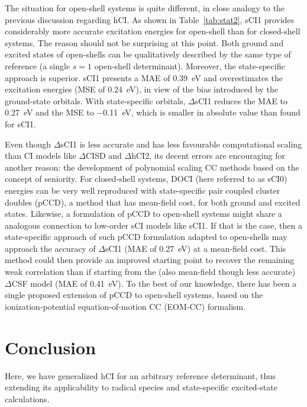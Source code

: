 \documentclass[aip,jcp,reprint,noshowkeys,superscriptaddress]{revtex4-1}
\begin{document}
The situation for open-shell systems is quite different, in close analogy to the previous discussion regarding hCI.
As shown in Table~\ref{tab:stat2}, sCI1 provides considerably more accurate excitation energies for open-shell than for closed-shell systems.
The reason should not be surprising at this point.
Both ground and excited states of open-shells can be qualitatively described by the same type of reference (a single $s=1$ open-shell determinant).
Moreover, the state-specific approach is superior.
sCI1 presents a MAE of \SI{0.39}{\eV} and overestimates the excitation energies (MSE of \SI{+0.24}{\eV}), in view of the bias introduced by the ground-state orbitals.
With state-specific orbitals, $\Delta$sCI1 reduces the MAE to \SI{0.27}{\eV} and the MSE to \SI{-0.11}{\eV}, which is smaller in absolute value than found for sCI1.

Even though $\Delta$sCI1 is less accurate and has less favourable computational scaling than CI models like $\Delta$CISD and $\Delta$hCI2,
its decent errors are encouraging for another reason:
the development of polynomial scaling CC methods based on the concept of seniority.
For closed-shell systems, DOCI (here referred to as sCI0) energies can be very well reproduced with state-specific pair coupled cluster doubles (pCCD), a method that has mean-field cost,
for both ground \cite{Bytautas_2011,Allen_1962,Smith_1965,Veillard_1967} and excited \cite{Kossoski_2021,Marie_2021} states.
Likewise, a formulation of pCCD to open-shell systems might share a analogous connection to low-order sCI models like sCI1.
If that is the case, then a state-specific approach of such pCCD formulation adapted to open-shells may approach the accuracy of $\Delta$sCI1 (MAE of \SI{0.27}{\eV}) at a mean-field cost.
This method could then provide an improved starting point to recover the remaining weak correlation than if starting from the (also mean-field though less accurate) $\Delta$CSF model (MAE of \SI{0.41}{\eV}).
To the best of our knowledge, there has been a single proposed extension of pCCD to open-shell systems, \cite{Boguslawski_2021}
based on the ionization-potential equation-of-motion CC (EOM-CC) formalism.


\section{Conclusion}
\label{sec:conclusion}

Here, we have generalized hCI \cite{Kossoski_2022} for an arbitrary reference determinant, thus extending its applicability to radical species and state-specific excited-state calculations.
\end{document}
